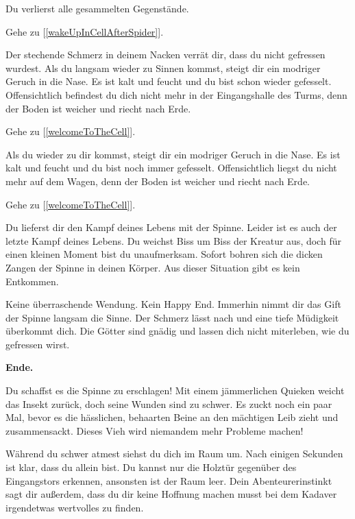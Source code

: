 Du verlierst alle gesammelten Gegenstände.

Gehe zu [\ref{wakeUpInCellAfterSpider}].


Der stechende Schmerz in deinem Nacken verrät dir, dass du nicht gefressen wurdest. Als du langsam wieder zu Sinnen kommst, steigt dir ein modriger Geruch in die Nase. Es ist kalt und feucht und du bist schon wieder gefesselt. Offensichtlich befindest du dich nicht mehr in der Eingangshalle des Turms, denn der Boden ist weicher und riecht nach Erde.

Gehe zu [\ref{welcomeToTheCell}].


Als du wieder zu dir kommst, steigt dir ein modriger Geruch in die Nase. Es ist kalt und feucht und du bist noch immer gefesselt. Offensichtlich liegst du nicht mehr auf dem Wagen, denn der Boden ist weicher und riecht nach Erde.

Gehe zu [\ref{welcomeToTheCell}].


Du lieferst dir den Kampf deines Lebens mit der Spinne. Leider ist es auch der letzte Kampf deines Lebens. Du weichst Biss um Biss der Kreatur aus, doch für einen kleinen Moment bist du unaufmerksam. Sofort bohren sich die dicken Zangen der Spinne in deinen Körper. Aus dieser Situation gibt es kein Entkommen.

Keine überraschende Wendung. Kein Happy End. Immerhin nimmt dir das Gift der Spinne langsam die Sinne. Der Schmerz lässt nach und eine tiefe Müdigkeit überkommt dich. Die Götter sind gnädig und lassen dich nicht miterleben, wie du gefressen wirst.

\textbf{Ende.}


Du schaffst es die Spinne zu erschlagen! Mit einem jämmerlichen Quieken weicht das Insekt zurück, doch seine Wunden sind zu schwer. Es zuckt noch ein paar Mal, bevor es die hässlichen, behaarten Beine an den mächtigen Leib zieht und zusammensackt. Dieses Vieh wird niemandem mehr Probleme machen!

Während du schwer atmest siehst du dich im Raum um. Nach einigen Sekunden ist klar, dass du allein bist. Du kannst nur die Holztür gegenüber des Eingangstors erkennen, ansonsten ist der Raum leer. Dein Abenteurerinstinkt sagt dir außerdem, dass du dir keine Hoffnung machen musst bei dem Kadaver irgendetwas wertvolles zu finden.


